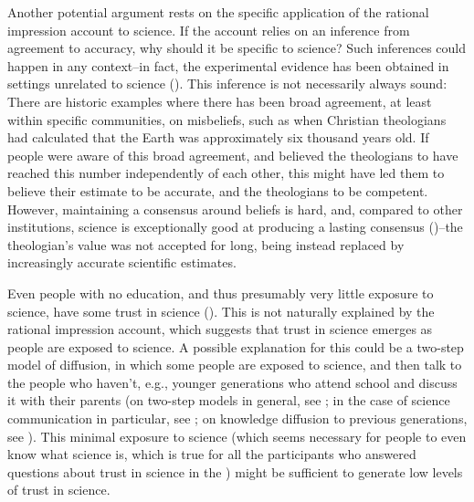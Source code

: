 \documentclass[
  jou,
  floatsintext,
  longtable,
  nolmodern,
  notxfonts,
  notimes,
  colorlinks=true,linkcolor=blue,citecolor=blue,urlcolor=blue]{apa7}
\begin{document}
Another potential argument rests on the specific application of the
rational impression account to science. If the account relies on an
inference from agreement to accuracy, why should it be specific to
science? Such inferences could happen in any context--in fact, the
experimental evidence has been obtained in settings unrelated to science
(). This inference is not necessarily always sound: There are
historic examples where there has been broad agreement, at least within
specific communities, on misbeliefs, such as when Christian theologians
had calculated that the Earth was approximately six thousand years old.
If people were aware of this broad agreement, and believed the
theologians to have reached this number independently of each other,
this might have led them to believe their estimate to be accurate, and
the theologians to be competent. However, maintaining a consensus around
beliefs is hard, and, compared to other institutions, science is
exceptionally good at producing a lasting consensus
()--the theologian's value was not accepted for long, being instead
replaced by increasingly accurate scientific estimates.

Even people with no education, and thus presumably very little exposure
to science, have some trust in science
(). This is not naturally explained by the rational
impression account, which suggests that trust in science emerges as
people are exposed to science. A possible explanation for this could be
a two-step model of diffusion, in which some people are exposed to
science, and then talk to the people who haven't, e.g., younger
generations who attend school and discuss it with their parents (on
two-step models in general, see
; in the case
of science communication in particular, see
;
on knowledge diffusion to previous generations, see
). This minimal exposure to science (which seems necessary for
people to even know what science is, which is true for all the
participants who answered questions about trust in science in the
) might be sufficient to generate low levels of
trust in science.
\end{document}
